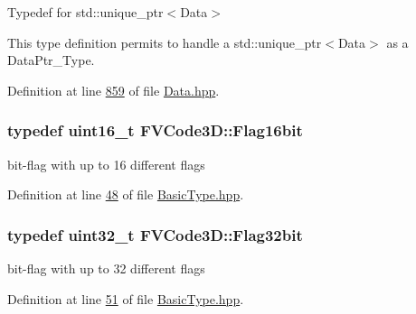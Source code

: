 \subsubsection[{\texorpdfstring{Data\+Ptr\+\_\+\+Type}{DataPtr_Type}}]{}\hypertarget{namespaceFVCode3D_a3d19a370a98afe491a9e17a646a9c56f}{}\label{namespaceFVCode3D_a3d19a370a98afe491a9e17a646a9c56f}


Typedef for std\+::unique\+\_\+ptr$<$\+Data$>$ 

This type definition permits to handle a std\+::unique\+\_\+ptr$<$\+Data$>$ as a Data\+Ptr\+\_\+\+Type. 

Definition at line \hyperlink{Data_8hpp_source_l00859}{859} of file \hyperlink{Data_8hpp_source}{Data.\+hpp}.

\subsubsection[{\texorpdfstring{Flag16bit}{Flag16bit}}]{\setlength{\rightskip}{0pt plus 5cm}typedef uint16\+\_\+t {\bf F\+V\+Code3\+D\+::\+Flag16bit}}\hypertarget{namespaceFVCode3D_a17a9cb86e2e25bbfbfcb645a2eec1d64}{}\label{namespaceFVCode3D_a17a9cb86e2e25bbfbfcb645a2eec1d64}


bit-\/flag with up to 16 different flags 



Definition at line \hyperlink{BasicType_8hpp_source_l00048}{48} of file \hyperlink{BasicType_8hpp_source}{Basic\+Type.\+hpp}.

\subsubsection[{\texorpdfstring{Flag32bit}{Flag32bit}}]{\setlength{\rightskip}{0pt plus 5cm}typedef uint32\+\_\+t {\bf F\+V\+Code3\+D\+::\+Flag32bit}}\hypertarget{namespaceFVCode3D_a74d2aa7527dcbbec13101b55a3cb149d}{}\label{namespaceFVCode3D_a74d2aa7527dcbbec13101b55a3cb149d}


bit-\/flag with up to 32 different flags 



Definition at line \hyperlink{BasicType_8hpp_source_l00051}{51} of file \hyperlink{BasicType_8hpp_source}{Basic\+Type.\+hpp}.


